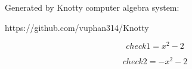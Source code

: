 \documentclass[letterpaper, 10pt]{extarticle}
\begin{document}
Generated by Knotty computer algebra system:

https://github.com/vuphan314/Knotty

\hrulefill

\begin{dmath*}
check1 =
    x^{2} - 2
\end{dmath*}


\begin{dmath*}
check2 =
    - x^{2} - 2
\end{dmath*}
\end{document}
